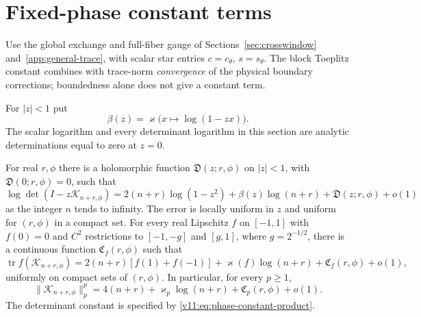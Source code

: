 \section{Fixed-phase constant terms}\label{v11:sec:phase-constants}
Use the global exchange and full-fiber gauge of
Sections~\ref{sec:crosswindow} and~\ref{app:general-trace}, with scalar
star entries $c=c_\theta$, $s=s_\theta$. The block Toeplitz constant
\cite[Theorem~2.3 and Corollary~2.4]{BasorEhrhardtVirtanen2024}
combines with trace-norm \emph{convergence} of the physical boundary
corrections; boundedness alone does not give a constant term.

For $|z|<1$ put
\[
 \beta(z)=\varkappa\bigl(x\mapsto\log(1-zx)\bigr).
\]
The scalar logarithm and every determinant logarithm in this section are
analytic determinations equal to zero at $z=0$.

\begin{theorem}
\label{v11:thm:phase-constant}\label{v11:cor:band-constant}
For real $r,\phi$ there is a holomorphic function
$\mathfrak D(z;r,\phi)$ on $|z|<1$, with $\mathfrak D(0;r,\phi)=0$, such that
\begin{equation}\label{v11:eq:phase-det}
 \log\det(I-z\mathcal K_{n+r,\phi})
 =2(n+r)\log(1-z^2)+\beta(z)\log(n+r)
       +\mathfrak D(z;r,\phi)+o(1)
\end{equation}
as the integer $n$ tends to infinity.  The error is locally uniform in
$z$ and uniform for $(r,\phi)$ in a compact set.
For every real Lipschitz $f$ on $[-1,1]$ with $f(0)=0$ and $C^2$
restrictions to $[-1,-g]$ and $[g,1]$, where $g=2^{-1/2}$, there is a
continuous function $\mathfrak C_f(r,\phi)$ such that
\begin{equation}\label{v11:eq:phase-smooth}
 \operatorname{tr}f(\mathcal K_{n+r,\phi})
 =2(n+r)[f(1)+f(-1)]+\varkappa(f)\log(n+r)
       +\mathfrak C_f(r,\phi)+o(1),
\end{equation}
uniformly on compact sets of $(r,\phi)$. In particular, for every $p\ge1$,
\begin{equation}\label{v11:eq:schatten-constant}
 \|\mathcal K_{n+r,\phi}\|_p^p
 =4(n+r)+\varkappa_p\log(n+r)+\mathfrak C_p(r,\phi)+o(1).
\end{equation}
The determinant constant is specified by
\eqref{v11:eq:phase-constant-product}.
\end{theorem}

